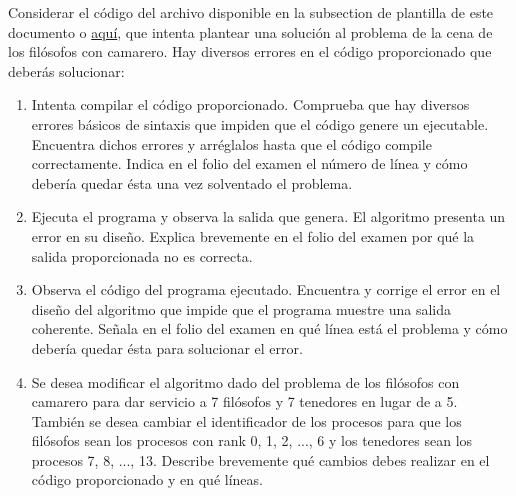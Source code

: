 \documentclass[a4paper,12pt]{article}
\begin{document}
Considerar el código del archivo disponible en la subsection de plantilla de este documento o \href{https://github.com/ElblogdeIsmael/ElblogdeIsmael.github.io/blob/main/Subjects/Third/SCD/Examenes/SegundoParcial/ETSIIT/code/ExamenCarlos/plantilla.cpp}{aquí}, que intenta plantear una solución al problema de la cena de los filósofos con camarero. Hay diversos errores en el código proporcionado que deberás solucionar:
\begin{enumerate}
    \item Intenta compilar el código proporcionado. Comprueba que hay diversos errores básicos de sintaxis que impiden que el código genere un ejecutable. Encuentra dichos errores y arréglalos hasta que el código compile correctamente. Indica en el folio del examen el número de línea y cómo debería quedar ésta una vez solventado el problema.
    \item Ejecuta el programa y observa la salida que genera. El algoritmo presenta un error en su diseño. Explica brevemente en el folio del examen por qué la salida proporcionada no es correcta.
    \item Observa el código del programa ejecutado. Encuentra y corrige el error en el diseño del algoritmo que impide que el programa muestre una salida coherente. Señala en el folio del examen en qué línea está el problema y cómo debería quedar ésta para solucionar el error.
    \item Se desea modificar el algoritmo dado del problema de los filósofos con camarero para dar servicio a 7 filósofos y 7 tenedores en lugar de a 5. También se desea cambiar el identificador de los procesos para que los filósofos sean los procesos con rank 0, 1, 2, ..., 6 y los tenedores sean los procesos 7, 8, ..., 13. Describe brevemente qué cambios debes realizar en el código proporcionado y en qué líneas.
\end{enumerate}


\end{document}
